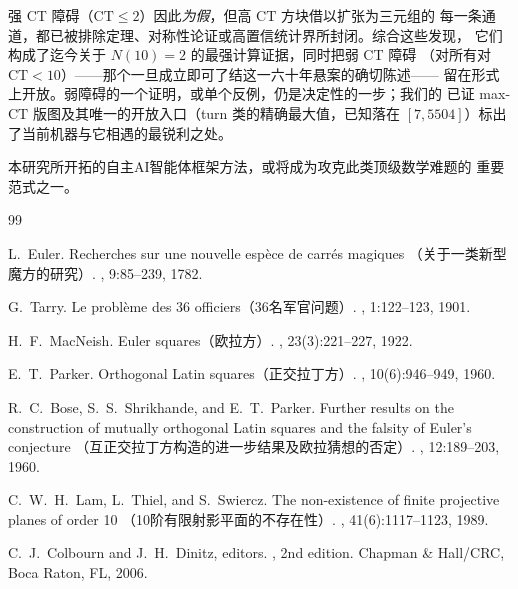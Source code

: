 \documentclass[11pt,a4paper]{ctexart}
\theoremstyle{remark}
\newcommand{\CT}{\mathrm{CT}}
\begin{document}
强 CT 障碍（$\CT \le 2$）因此\emph{为假}，但高 $\CT$ 方块借以扩张为三元组的
每一条通道，都已被排除定理、对称性论证或高置信统计界所封闭。综合这些发现，
它们构成了迄今关于 $N(10) = 2$ 的最强计算证据，同时把弱 CT 障碍
（对所有对 $\CT < 10$）——那个一旦成立即可了结这一六十年悬案的确切陈述——
留在形式上开放。弱障碍的一个证明，或单个反例，仍是决定性的一步；我们的
已证 max-$\CT$ 版图及其唯一的开放入口（turn 类的精确最大值，已知落在
$[7,5504]$）标出了当前机器与它相遇的最锐利之处。

本研究所开拓的自主AI智能体框架方法，或将成为攻克此类顶级数学难题的
重要范式之一。


\begin{thebibliography}{99}

L.\ Euler.
\newblock Recherches sur une nouvelle esp\`{e}ce de carr\'{e}s magiques
  （关于一类新型魔方的研究）.
, 9:85--239, 1782.

G.\ Tarry.
\newblock Le probl\`{e}me des 36 officiers（36名军官问题）.
, 1:122--123, 1901.

H.\ F.\ MacNeish.
\newblock Euler squares（欧拉方）.
, 23(3):221--227, 1922.

E.\ T.\ Parker.
\newblock Orthogonal Latin squares（正交拉丁方）.
,
  10(6):946--949, 1960.

R.\ C.\ Bose, S.\ S.\ Shrikhande, and E.\ T.\ Parker.
\newblock Further results on the construction of mutually orthogonal Latin
  squares and the falsity of Euler's conjecture
  （互正交拉丁方构造的进一步结果及欧拉猜想的否定）.
, 12:189--203, 1960.

C.\ W.\ H.\ Lam, L.\ Thiel, and S.\ Swiercz.
\newblock The non-existence of finite projective planes of order 10
  （10阶有限射影平面的不存在性）.
, 41(6):1117--1123, 1989.

C.\ J.\ Colbourn and J.\ H.\ Dinitz, editors.
, 2nd edition.
\newblock Chapman \& Hall/CRC, Boca Raton, FL, 2006.


\end{thebibliography}
\end{document}
